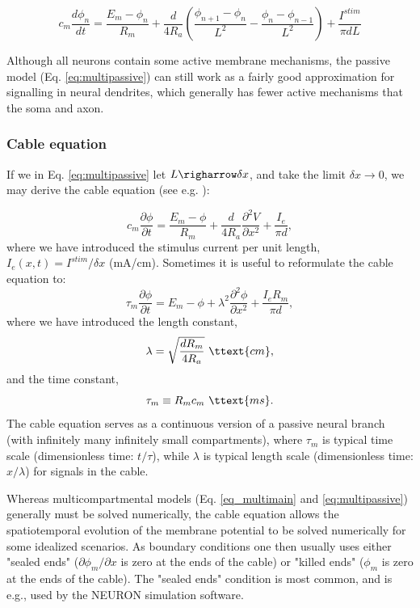 \begin{equation}
c_m \frac{d\phi_n}{dt} = \frac{E_m-\phi_n}{R_m} + \frac{d}{4R_a}\left(\frac{\phi_{n+1}-\phi_n}{L^2} - \frac{\phi_n-\phi_{n-1}}{L^2} \right) + \frac{I^{stim}}{\pi d L}
\label{eq:multipassive}
\end{equation}

Although all neurons contain some active membrane mechanisms, the passive model (Eq. \ref{eq:multipassive}) can still work as a fairly good approximation for signalling in neural dendrites, which generally has fewer active mechanisms that the soma and axon. 



\subsubsection{Cable equation}
If we in Eq. \ref{eq:multipassive} let $L \righarrow \delta x$, and take the limit $\delta x \rightarrow 0$, we may derive the cable equation (see e.g. \cite{Sterratt2011}): 

\begin{equation}
c_m \frac{\partial \phi}{\partial t} = \frac{E_m-\phi}{R_m} +  \frac{d}{4 R_a}  \frac{\partial^2 V}{\partial x^2}  + \frac{I_e}{\pi d},
\label{eq:cable}
\end{equation}
where we have introduced the stimulus current per unit length, $I_e(x,t) = I^{stim}/\delta x$ (mA/cm). Sometimes it is useful to reformulate the cable equation to:
\begin{equation}
\tau_m \frac{\partial \phi}{\partial t} = E_m-\phi +   \lambda^2  \frac{\partial^2 \phi}{\partial x^2}  + \frac{I_e R_m}{\pi d},
\label{eq:cable2}
\end{equation}
where we have introduced the length constant,
\begin{equation}
\lambda = \sqrt{\frac{d R_m}{4 R_a}} \,\, \ttext{cm}, 
\label{eq:lengthconst}
\end{equation}
and the time constant, 
\begin{equation}
\tau_m \equiv R_m c_m  \,\, \ttext{ms}.
\label{eq:lengthconst}
\end{equation}
The cable equation serves as a continuous version of a passive neural branch (with infinitely many infinitely small compartments), 
where $\tau_m$ is typical time scale (dimensionless time: $t/\tau$), while $\lambda$  is typical length scale  (dimensionless time: $x/\lambda$) for signals in the cable. 

Whereas multicompartmental models (Eq. \ref{eq_multimain} and \ref{eq:multipassive}) generally must be solved numerically, the cable equation allows the spatiotemporal evolution of the membrane potential to be solved numerically for some idealized scenarios. As boundary conditions one then usually uses either "sealed ends" ($\partial \phi_m/\partial x$ is zero at the ends of the cable) or "killed ends" ($\phi_m$ is zero at the ends of the cable). The "sealed ends" condition is most common, and is e.g., used by the NEURON simulation software. 


